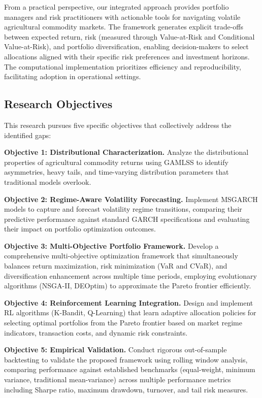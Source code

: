 \documentclass[
  10pt,
  a4paper,
]{article}
\begin{document}
From a practical perspective, our integrated approach provides portfolio
managers and risk practitioners with actionable tools for navigating
volatile agricultural commodity markets. The framework generates
explicit trade-offs between expected return, risk (measured through
Value-at-Risk and Conditional Value-at-Risk), and portfolio
diversification, enabling decision-makers to select allocations aligned
with their specific risk preferences and investment horizons. The
computational implementation prioritizes efficiency and reproducibility,
facilitating adoption in operational settings.

\subsection{Research Objectives}\label{research-objectives}

This research pursues five specific objectives that collectively address
the identified gaps:

\textbf{Objective 1: Distributional Characterization.} Analyze the
distributional properties of agricultural commodity returns using GAMLSS
to identify asymmetries, heavy tails, and time-varying distribution
parameters that traditional models overlook.

\textbf{Objective 2: Regime-Aware Volatility Forecasting.} Implement
MSGARCH models to capture and forecast volatility regime transitions,
comparing their predictive performance against standard GARCH
specifications and evaluating their impact on portfolio optimization
outcomes.

\textbf{Objective 3: Multi-Objective Portfolio Framework.} Develop a
comprehensive multi-objective optimization framework that simultaneously
balances return maximization, risk minimization (VaR and CVaR), and
diversification enhancement across multiple time periods, employing
evolutionary algorithms (NSGA-II, DEOptim) to approximate the Pareto
frontier efficiently.

\textbf{Objective 4: Reinforcement Learning Integration.} Design and
implement RL algorithms (K-Bandit, Q-Learning) that learn adaptive
allocation policies for selecting optimal portfolios from the Pareto
frontier based on market regime indicators, transaction costs, and
dynamic risk constraints.

\textbf{Objective 5: Empirical Validation.} Conduct rigorous
out-of-sample backtesting to validate the proposed framework using
rolling window analysis, comparing performance against established
benchmarks (equal-weight, minimum variance, traditional mean-variance)
across multiple performance metrics including Sharpe ratio, maximum
drawdown, turnover, and tail risk measures.
\end{document}

